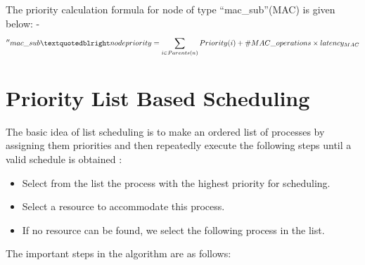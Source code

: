 The priority calculation formula for node of type “mac\_sub”(MAC) is given below: -
\begin{equation*}
    \centering
    ''mac\_sub” node priority = \sum_{i \in Parents(n)} Priority(i) +\#MAC\_operations \times latency_{MAC}
\end{equation*}

\section{Priority List Based Scheduling}

The basic idea of list scheduling is to make an ordered list of processes by assigning them  priorities and then repeatedly execute the following steps until a valid schedule is obtained :
\begin{itemize}
        \item Select from the list the process with the highest priority for scheduling.
        \item Select a resource to accommodate this process.
        \item If no resource can be found, we select the following process in the list.
\end{itemize}

The important steps in the algorithm are as follows:

